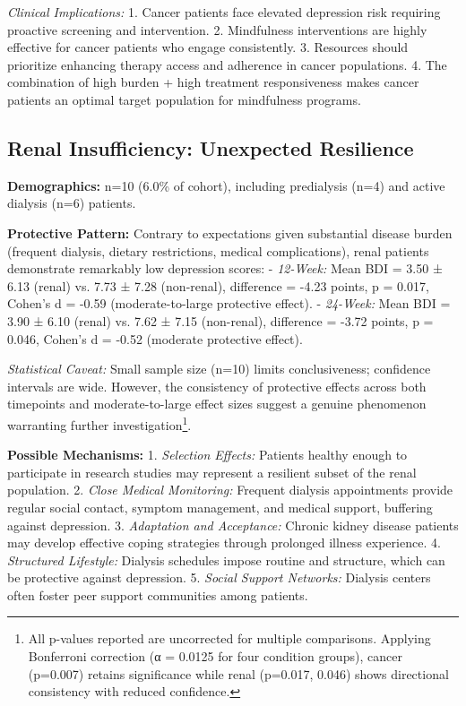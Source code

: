 \documentclass[conference]{IEEEtran}
\begin{document}
\textit{Clinical Implications:} 
1. Cancer patients face elevated depression risk requiring proactive screening and intervention.
2. Mindfulness interventions are highly effective for cancer patients who engage consistently.
3. Resources should prioritize enhancing therapy access and adherence in cancer populations.
4. The combination of high burden + high treatment responsiveness makes cancer patients an optimal target population for mindfulness programs.

\subsection{Renal Insufficiency: Unexpected Resilience}

\textbf{Demographics:} n=10 (6.0\% of cohort), including predialysis (n=4) and active dialysis (n=6) patients.

\textbf{Protective Pattern:} Contrary to expectations given substantial disease burden (frequent dialysis, dietary restrictions, medical complications), renal patients demonstrate remarkably low depression scores:
- \textit{12-Week:} Mean BDI = 3.50 ± 6.13 (renal) vs. 7.73 ± 7.28 (non-renal), difference = -4.23 points, p = 0.017, Cohen's d = -0.59 (moderate-to-large protective effect).
- \textit{24-Week:} Mean BDI = 3.90 ± 6.10 (renal) vs. 7.62 ± 7.15 (non-renal), difference = -3.72 points, p = 0.046, Cohen's d = -0.52 (moderate protective effect).

\textit{Statistical Caveat:} Small sample size (n=10) limits conclusiveness; confidence intervals are wide. However, the consistency of protective effects across both timepoints and moderate-to-large effect sizes suggest a genuine phenomenon warranting further investigation\footnote{All p-values reported are uncorrected for multiple comparisons. Applying Bonferroni correction (α = 0.0125 for four condition groups), cancer (p=0.007) retains significance while renal (p=0.017, 0.046) shows directional consistency with reduced confidence.}.

\textbf{Possible Mechanisms:}
1. \textit{Selection Effects:} Patients healthy enough to participate in research studies may represent a resilient subset of the renal population.
2. \textit{Close Medical Monitoring:} Frequent dialysis appointments provide regular social contact, symptom management, and medical support, buffering against depression.
3. \textit{Adaptation and Acceptance:} Chronic kidney disease patients may develop effective coping strategies through prolonged illness experience.
4. \textit{Structured Lifestyle:} Dialysis schedules impose routine and structure, which can be protective against depression.
5. \textit{Social Support Networks:} Dialysis centers often foster peer support communities among patients.
\end{document}
